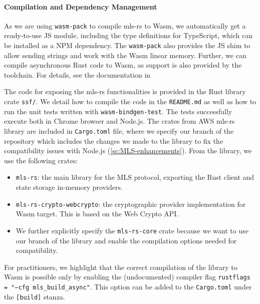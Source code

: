 \paragraph{Compilation and Dependency Management}
As we are using \texttt{wasm-pack} to compile mls-rs to Wasm, we automatically
get a ready-to-use JS module, including the type definitions for TypeScript,
which can be installed as a NPM dependency. The \texttt{wasm-pack} also 
provides the JS shim to allow sending strings and work with the Wasm linear
memory. Further, we can compile asynchronous Rust code to Wasm, as support is also
provided by the toolchain. For details, see the documentation in~\cite{WasmBindgen}

The code for exposing the mls-rs functionalities is provided in the Rust library crate
\texttt{ssf/}. We detail how to compile the code in the \texttt{README.md}
as well as how to run the unit tests written with \texttt{wasm-bindgen-test}.
The tests successfully execute both in Chrome browser and Node.js.
The crates from AWS mls-rs library are included in \texttt{Cargo.toml}
file, where we specify our branch of the repository which 
includes the changes we made to the library to fix the compatibility issues
with Node.js (\cref{sc:MLS-enhancements}). From the library, we use the following crates:
\begin{itemize}
    \item \texttt{mls-rs}: the main library for the MLS protocol, exporting the Rust client and state storage in-memory providers.
    \item \texttt{mls-rs-crypto-webcrypto}: the cryptographic provider implementation for Wasm target. This is based on the Web Crypto API.
    \item We further explicitly specify the \texttt{mls-rs-core} crate because we want to use our branch of the library and enable the compilation options needed for compatibility.
\end{itemize}

For practitioners, we highlight that
the correct compilation of the library to Wasm is possible only by enabling the
(undocumented) compiler flag \texttt{rustflags = "--cfg mls\_build\_async"}. This option can be added
to the \texttt{Cargo.toml} under the \texttt{[build]} stanza.

